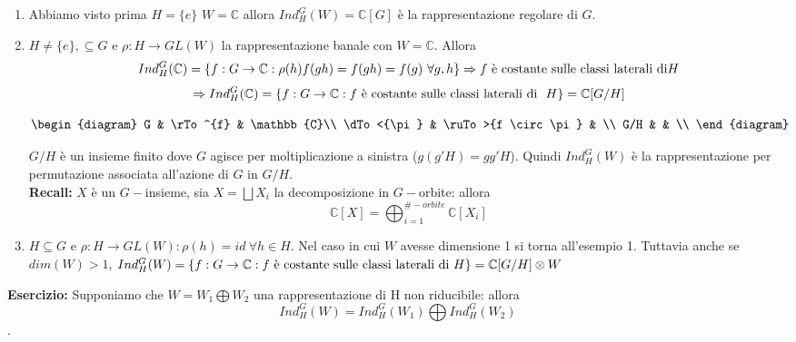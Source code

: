 \documentclass[11pt]{article}
\theoremstyle{plain}
\theoremstyle{definition}
\theoremstyle{remark}
\newcommand{\C}{\mathbb{C}}
\begin{document}
\begin{enumerate}
\item Abbiamo visto prima $H=\{e\}$ $W=\C$ allora $Ind_H^G(W)=\C[G]$ è la rappresentazione regolare di $G$. 
\item $H\neq \{e\},\subseteq G$ e $\rho:H\rightarrow GL(W)$ la rappresentazione banale con $W=\C$. Allora
\[Ind_H^G(\C)=\{f:G\rightarrow \C:\rho(h)f(gh)=f(gh)=f(g)\ \forall g,h\}\Rightarrow f \textup{ è costante sulle classi laterali di} H\]
\[\Rightarrow Ind_H^G(\C)=\{f:G\rightarrow \C:f \textup{ è costante sulle classi laterali di }\ H\}=\C[G/H]\]



\[
\begin{diagram}
G          & \rTo^{f}            & \C \\
\dTo<{\pi} & \ruTo>{f \circ \pi} &    \\
G/H        &                     &    \\
\end{diagram}
\]


$G/H$ è un insieme finito dove $G$ agisce per moltiplicazione a sinistra ($g(g'H)=gg'H$). Quindi $Ind_H^G(W)$ è la rappresentazione per permutazione associata all'azione di $G$ in $G/H$. \\
\textbf{Recall:} $X$ è un $G-$insieme, sia $X= \bigsqcup X_i$ la decomposizione in $G-$orbite: allora 
\[\C[X]=\bigoplus_{i=1}^{\#-orbite} \C[X_i]\] 
\item $H\subseteq G$ e $\rho:H\rightarrow GL(W): \rho(h)=id\ \forall h\in H$. Nel caso in cui $W$ avesse dimensione 1 si torna all'esempio 1. Tuttavia anche se $dim(W)>1$, $Ind_H^G(W)=\{f:G\rightarrow \C:f \textup{ è costante sulle classi laterali di } H\}=\C[G/H]\otimes W$ 
\end{enumerate}
\textbf{Esercizio:} Supponiamo che $W=W_1\bigoplus W_2$ una rappresentazione di H non riducibile: allora 
\[Ind_H^G(W)=Ind_H^G(W_1)\bigoplus Ind_H^G(W_2)\].
\end{document}
